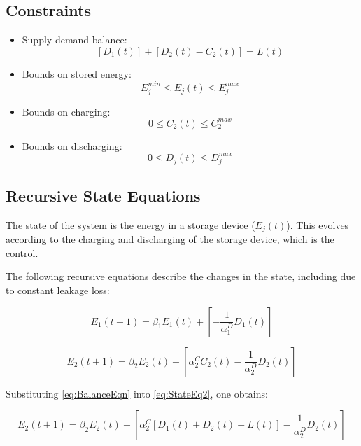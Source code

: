 \documentclass{article}
\begin{document}
	\subsection{Constraints}
	\begin{itemize}
		\item Supply-demand balance: 
		\begin{equation} \label{eq:BalanceEqn}\left[D_{1}(t)\right] + \left[D_{2}(t) - C_{2}(t)\right] = L(t) \end{equation}
						
		\item Bounds on stored energy: 
		\begin{equation}E_{j}^{min}\leq E_{j}(t)\leq E_{j}^{max}\end{equation}
		\item Bounds on charging:
		\begin{equation}0\leq C_{2}(t)\leq C_{2}^{max}\end{equation}
		\item Bounds on discharging:
		\begin{equation}0\leq D_{j}(t)\leq D_{j}^{max}\end{equation}
	\end{itemize}

	\subsection{Recursive State Equations}
	 The state of the system is the energy in a storage device ($E_{j}(t)$). This evolves according to the charging and discharging of the storage device, which is the control.
	 
	 The following recursive equations describe the changes in the state, including due to constant leakage loss:
	 
	 \begin{equation}\label{eq:StateEq1}E_{1}(t+1)=\beta_{1}E_{1}(t)+\left[-\frac{1}{\alpha_{1}^{D}}D_{1}(t)\right] \end{equation}
	 
	 \begin{equation}\label{eq:StateEq2}E_{2}(t+1)=\beta_{2}E_{2}(t)+\left[\alpha_{2}^{C}C_{2}(t)-\frac{1}{\alpha_{2}^{D}}D_{2}(t)\right]\end{equation}
	 
	 Substituting \eqref{eq:BalanceEqn} into \eqref{eq:StateEq2}, one obtains:
	 
	 \begin{equation}\label{eq:DPStateEq2}E_{2}(t+1)=\beta_{2}E_{2}(t)+\left[\alpha_{2}^{C}[D_{1}(t)+D_{2}(t)-L(t)]-\frac{1}{\alpha_{2}^{D}}D_{2}(t)\right]\end{equation}
	 
\end{document}
